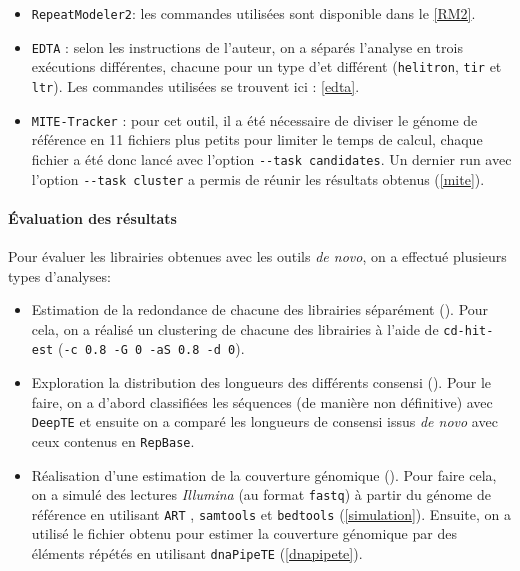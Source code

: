 \documentclass[10pt]{article}
\begin{document}
\begin{itemize}
    \item[\ding{42}] \texttt{RepeatModeler2}: les commandes utilisées sont disponible dans le \autoref{RM2}. 
    \item[\ding{42}] \texttt{EDTA} \cite{ou_benchmarking_2019}: selon les instructions de l'auteur, on a séparés l'analyse en trois exécutions différentes, chacune pour un type d'\acrshort{et} différent (\texttt{helitron}, \texttt{\acrshort{tir}} et \texttt{\acrshort{ltr}}). Les commandes utilisées se trouvent ici : \autoref{edta}.
    \item[\ding{42}] \texttt{MITE-Tracker} \cite{crescente_mite_2018}: pour cet outil, il a été nécessaire de diviser le génome de référence en 11 fichiers plus petits pour limiter le temps de calcul, chaque fichier a été donc lancé avec l'option \texttt{-{}-task candidates}. Un dernier run avec l'option \texttt{-{}-task cluster} a permis de réunir les résultats obtenus (\autoref{mite}).
\end{itemize}

\paragraph{\'Evaluation des résultats}\label{par:eval} Pour évaluer les librairies obtenues avec les outils \textit{de novo}, on a effectué plusieurs types d'analyses: \\

\begin{itemize}
    \item[\ding{42}] Estimation de la redondance de chacune des librairies séparément (). Pour cela, on a réalisé un clustering de chacune des librairies à l'aide de \texttt{cd-hit-est} \cite{fu_cd-hit_2012} (\texttt{-c 0.8 -G 0 -aS 0.8 -d 0}). \\
    
    \item[\ding{42}] Exploration la distribution des longueurs des différents consensi (). Pour le faire, on a d'abord classifiées les séquences (de manière non définitive) avec \texttt{DeepTE} \cite{yan_deepte_2020} et ensuite on a comparé les longueurs de consensi issus \textit{de novo} avec ceux contenus en \texttt{RepBase}. \\ 
    
    \item[\ding{42}] Réalisation d'une estimation de la couverture génomique (). Pour faire cela, on a simulé des lectures \textit{Illumina} (au format \texttt{fastq}) à partir du génome de référence en utilisant \texttt{ART} \cite{huang_art_2012}, \texttt{samtools} \cite{danecek_twelve_2021} et \texttt{bedtools} \cite{quinlan_bedtools_2010} (\autoref{simulation}). Ensuite, on a utilisé le fichier obtenu pour estimer la couverture génomique par des éléments répétés en utilisant \texttt{dnaPipeTE} \cite{goubert_novo_2015} (\autoref{dnapipete}).
\end{itemize}
\end{document}
